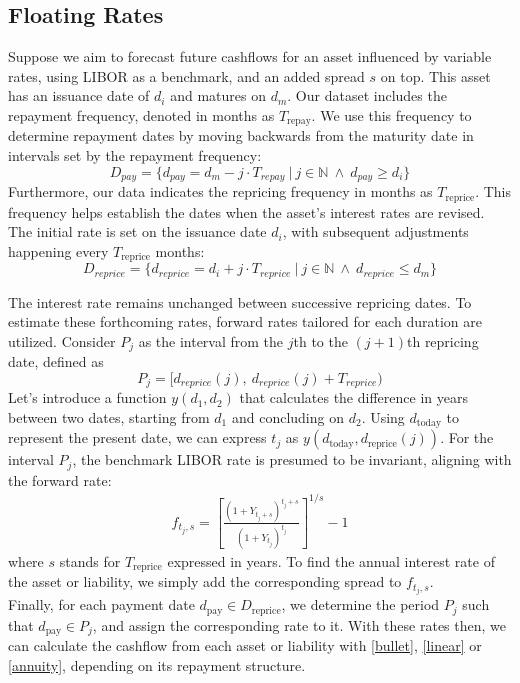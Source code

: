 \documentclass[11pt]{article}
\begin{document}
\subsection{Floating Rates}


Suppose we aim to forecast future cashflows for an asset influenced by variable rates, using LIBOR as a benchmark, and an added spread \(s\) on top. This asset has an issuance date of \(d_i\) and matures on \(d_m\). Our dataset includes the repayment frequency, denoted in months as \(T_{\text{repay}}\). We use this frequency to determine repayment dates by moving backwards from the maturity date in intervals set by the repayment frequency:
$$D_{pay}=\{d_{pay}=d_m-j\cdot T_{repay}\ |\ j\in \mathbb{N}\ \wedge\ d_{pay}\geq d_i\}$$
Furthermore, our data indicates the repricing frequency in months as \(T_{\text{reprice}}\). This frequency helps establish the dates when the asset's interest rates are revised. The initial rate is set on the issuance date \(d_i\), with subsequent adjustments happening every \(T_{\text{reprice}}\) months:
 $$D_{reprice}= \{d_{reprice}=d_i+j\cdot T_{reprice}\ |\ j\in\mathbb{N}\ \wedge\ d_{reprice} \leq d_m\}$$

The interest rate remains unchanged between successive repricing dates. To estimate these forthcoming rates, forward rates tailored for each duration are utilized. Consider $P_j$ as the interval from the $j$th to the $(j+1)$th repricing date, defined as
$$P_j=[d_{reprice}(j),\ d_{reprice}(j)+T_{reprice})$$
Let's introduce a function \(y(d_1,d_2)\) that calculates the difference in years between two dates, starting from \(d_1\) and concluding on \(d_2\). Using \(d_{\text{today}}\) to represent the present date, we can express \(t_j\) as \(y(d_{\text{today}},d_{\text{reprice}}(j))\). For the interval \(P_j\), the benchmark LIBOR rate is presumed to be invariant, aligning with the forward rate:
\begin{align}
	f_{t_j,s}=\left[ \frac{(1 + Y_{t_j+s})^{t_j+s}}{(1 + Y_{t_j})^{t_j}} \right]^{1/s} - 1	
\end{align}
where \(s\) stands for \(T_{\text{reprice}}\) expressed in years. To find the annual interest rate of the asset or liability, we simply add the corresponding spread to $f_{t_j,s}$.\\

Finally, for each payment date \(d_{\text{pay}}\in D_{\text{reprice}}\), we determine the period \(P_j\) such that \(d_{\text{pay}}\in P_j\), and assign the corresponding rate to it. With these rates then, we can calculate the cashflow from each asset or liability with \eqref{bullet}, \eqref{linear} or \eqref{annuity}, depending on its repayment structure.\\
\end{document}
